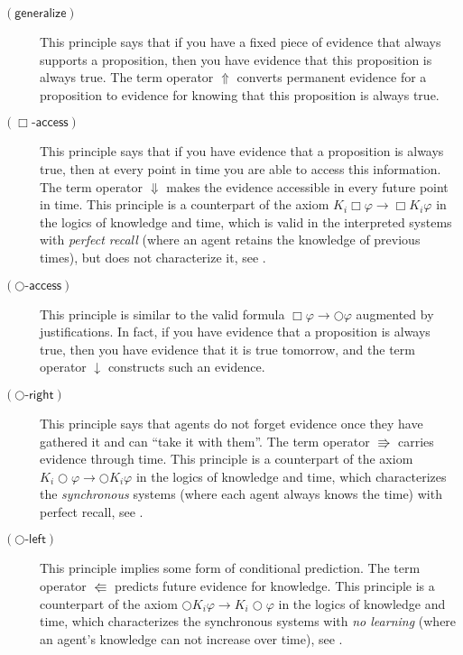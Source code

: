 \documentclass[envcountsect,envcountsame,oribibl,orivec]{llncs}
\newcommand{\lnext}{\bigcirc}
\newcommand{\lalways}{\Box}
\newcommand{\tnext}{\Rrightarrow}
\newcommand{\tprev}{\Lleftarrow}
\newcommand{\talwaysaccess}{\Downarrow}
\newcommand{\tgeneralize}{\Uparrow}
\newcommand{\tnextaccess}{\downarrow}
\newcommand{\alwaysaccessprinciple}{\ensuremath{(\lalways\textsf{-access})}}
\newcommand{\generalizeprinciple}{\ensuremath{(\textsf{generalize})}}
\newcommand{\nextaccessprinciple}{\ensuremath{(\lnext\textsf{-access})}}
\newcommand{\nextrightshiftprinciple}{\ensuremath{(\lnext\textsf{-right})}}
\newcommand{\nextleftshiftprinciple}{\ensuremath{(\lnext\textsf{-left})}}
\renewcommand{\phi}{\varphi}
\begin{document}
\begin{description}
	\item[\generalizeprinciple] This principle says that if you have a fixed piece of evidence that always supports a proposition, then you have evidence that this proposition is always true. The term operator $\tgeneralize$ converts permanent evidence for a proposition to evidence for knowing that this proposition is always true.
		
	\item[\alwaysaccessprinciple] This principle says that if you have evidence that a proposition is always true, then at every point in time you are able to access this information. The term operator $\talwaysaccess$ makes the evidence accessible in every future point in time. This principle is a counterpart of the axiom $K_i \lalways \phi \to \lalways K_i \phi$ in the logics of knowledge and time, which is valid in the interpreted systems with \emph{perfect recall} (where an agent retains the knowledge of previous times), but does not characterize it,  see \cite{HvdMV04}.
	
	\item[\nextaccessprinciple] This principle is similar to the valid formula $\lalways \phi \to \lnext \phi$ augmented by justifications. In fact, if you have evidence that a proposition is always true, then you have evidence that it is true tomorrow, and the term operator $\tnextaccess$ constructs such an evidence. 

	\item[\nextrightshiftprinciple] This principle says that agents do not forget evidence once they have gathered it and can ``take it with them''. The term operator $\tnext$ carries evidence through time. This principle is a counterpart of the axiom $K_i \lnext \phi \to \lnext K_i \phi$ in the logics of knowledge and time, which characterizes the  \emph{synchronous} systems (where each agent always knows the time) with perfect recall, see \cite{HvdMV04}.
	
	\item[\nextleftshiftprinciple] This principle implies some form of conditional prediction. The term operator $\tprev$ predicts future evidence for knowledge. This principle is a counterpart of the axiom $\lnext K_i \phi \to K_i \lnext \phi$ in the logics of knowledge and time, which characterizes the synchronous  systems with \emph{no learning} (where an agent's knowledge can not increase over time), see \cite{HvdMV04}.
\end{description}
\end{document}
